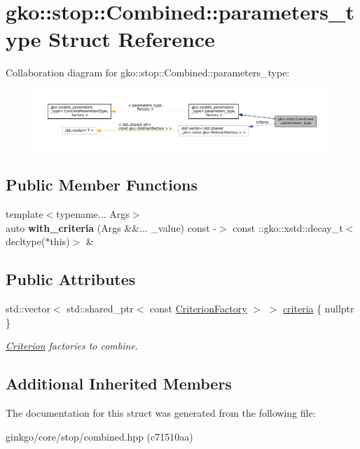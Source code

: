 \hypertarget{structgko_1_1stop_1_1Combined_1_1parameters__type}{}\section{gko\+:\+:stop\+:\+:Combined\+:\+:parameters\+\_\+type Struct Reference}
\label{structgko_1_1stop_1_1Combined_1_1parameters__type}


Collaboration diagram for gko\+:\+:stop\+:\+:Combined\+:\+:parameters\+\_\+type\+:
\nopagebreak
\begin{figure}[H]
\begin{center}
\leavevmode
\includegraphics[width=350pt]{structgko_1_1stop_1_1Combined_1_1parameters__type__coll__graph}
\end{center}
\end{figure}
\subsection*{Public Member Functions}
\begin{DoxyCompactItemize}
\item 
\mbox{\label{structgko_1_1stop_1_1Combined_1_1parameters__type_ae9e759fd53bb4bef3e8899a5bb462eec}} 
{\footnotesize template$<$typename... Args$>$ }\\auto {\bfseries with\+\_\+criteria} (Args \&\&... \+\_\+value) const -\/$>$ const \+::gko\+::xstd\+::decay\+\_\+t$<$ decltype($\ast$this)$>$ \&
\end{DoxyCompactItemize}
\subsection*{Public Attributes}
\begin{DoxyCompactItemize}
\item 
\mbox{\label{structgko_1_1stop_1_1Combined_1_1parameters__type_a2ab63880c1758c42b3a175cd6b004635}} 
std\+::vector$<$ std\+::shared\+\_\+ptr$<$ const \hyperlink{namespacegko_1_1stop_ab12a51109c50b35ec36dc5a393d6a9a0}{Criterion\+Factory} $>$ $>$ \hyperlink{structgko_1_1stop_1_1Combined_1_1parameters__type_a2ab63880c1758c42b3a175cd6b004635}{criteria} \{ nullptr \}
\begin{DoxyCompactList}\small\item\em \hyperlink{classgko_1_1stop_1_1Criterion}{Criterion} factories to combine. \end{DoxyCompactList}\end{DoxyCompactItemize}
\subsection*{Additional Inherited Members}


The documentation for this struct was generated from the following file\+:\begin{DoxyCompactItemize}
\item 
ginkgo/core/stop/combined.\+hpp (c71510aa)\end{DoxyCompactItemize}
